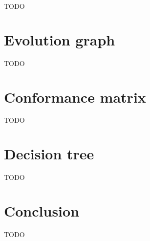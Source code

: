 TODO

\section{Evolution graph}
\label{evolution}

TODO

\section{Conformance matrix}
\label{matrix}

TODO

\section{Decision tree}
\label{tree}

TODO

\section{Conclusion}
\label{conclusion}

TODO




\renewcommand{\addcontentsline}[3]{}%







